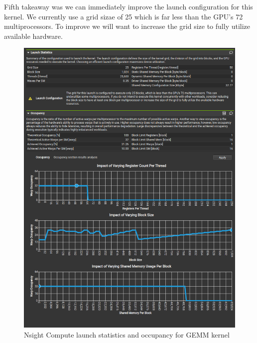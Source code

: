 \documentclass[12pt,letterpaper,twoside]{article}
\begin{document}
Fifth takeaway was we can immediately improve the launch configuration for this kernel.
We currently use a grid sizae of 25 which is far less than the GPU's 72 multiprocessors.
To improve we will want to increase the grid size to fully utilize available hardware.

\begin{figure}[!htbp]
    \centering
    \includegraphics[scale=0.5]{nsight_compute_lao.png}
    \caption{Nsight Compute launch statistics and occupancy for GEMM kernel}
\end{figure}
\end{document}
